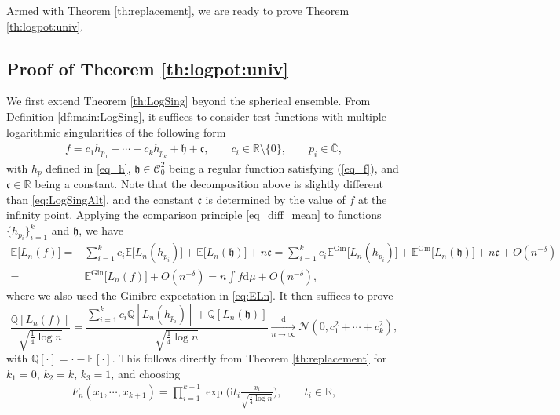 \documentclass[10pt,reqno]{amsart}
\numberwithin{equation}{section}
\numberwithin{figure}{section}
\theoremstyle{plain}
\newcommand{\R}{{\mathbb{R}}}
\newcommand{\C}{{\mathbb{C}}}
\newcommand{\ii}{\mathrm{i}}
\newcommand{\<}{\langle}
\renewcommand{\>}{\rangle}
\newcommand{\E}{\mathbb{E}}
\begin{document}
Armed with Theorem \ref{th:replacement}, we are ready to prove Theorem \ref{th:logpot:univ}.



\subsection{Proof of Theorem \ref{th:logpot:univ}}



We first extend Theorem \ref{th:LogSing} beyond the spherical ensemble. From Definition \ref{df:main:LogSing}, it suffices to consider test functions with multiple logarithmic singularities of the following form
\begin{align}\label{eq_decomp}
f=c_1 h_{p_1}+\cdots +c_k h_{p_k}+\mathfrak{h}+\mathfrak{c}, \qquad c_i \in \R \setminus \{0\}, \qquad p_i \in \overline{\C},
\end{align}
with $h_{p}$ defined in \eqref{eq_h},  $\mathfrak{h} \in \mathcal{C}_0^2$ being a regular function satisfying (\ref{eq_f}), and $\mathfrak{c}\in \R$ being a constant. Note that the decomposition above is slightly different than \eqref{eq:LogSingAlt}, and the constant $\mathfrak{c}$ is determined by the value of $f$ at the infinity point.  Applying the comparison principle \eqref{eq_diff_mean} to functions $\{h_{p_i}\}_{i=1}^{k}$ and $\mathfrak{h}$, we have
\begin{align}\label{eq_goal_mean}
\E\big[L_n(f)\big]=&\sum_{i=1}^k c_i\E\big[L_n(h_{p_{i}})\big]+\E\big[L_n(\mathfrak{h})\big]+n \mathfrak{c}=\sum_{i=1}^k c_i\E^{\mathrm{Gin}}\big[L_n(h_{p_{i}})\big]+\E^{\mathrm{Gin}}\big[L_n(\mathfrak{h})\big]+n \mathfrak{c}+O(n^{-\delta})\\
=&\E^{\mathrm{Gin}}\big[L_n(f)\big]+O(n^{-\delta})=n\int f\mathrm d \mu+O(n^{-\delta}),
\end{align}
where we also used the Ginibre expectation in \eqref{eq:ELn}. It then suffices to prove
   \begin{equation}\label{eq_goal_dist}
   \frac{\mathbb{Q} [L_n(f)]}{\sqrt{\frac{1}{4}\log n}} =\frac{\sum_{i=1}^{k} c_i \mathbb{Q} [L_n(h_{p_i})]+\mathbb{Q} [L_n(\mathfrak{h})]}{\sqrt{\frac{1}{4}\log n}} 
      \xrightarrow[n \to \infty]{\mathrm{d}}
	   \mathcal{N}(0, c_1^2+\cdots+c_k^2),
    \end{equation}
    with $\mathbb{Q}[\cdot]=\cdot-\mathbb{E}[\cdot]$. This follows directly from Theorem \ref{th:replacement} for $k_1=0$, $k_2=k$, $k_3=1$, and choosing  
\begin{align}\label{eq_FF}
F_n(x_{1}, \cdots,x_{k+1})=\prod_{i=1}^{k+1} \exp\Big(\ii t_i \frac{x_i}{\sqrt{\frac{1}{4}\log n}}\Big), \qquad t_i \in \R,
\end{align}
\end{document}
